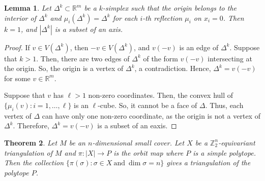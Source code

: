 \documentclass[11pt]{amsart}
\numberwithin{equation}{section}
\newtheorem{theorem}{Theorem}[section]
\newtheorem{lemma}[theorem]{Lemma}
\theoremstyle{definition}
\def \bb{\mathbb}
\def \RR{{\bb{R}}}
\def \ZZ{{\bb{Z}}}
\begin{document}
\begin{lemma}\label{lem_simp_ref}
Let $\Delta^k \subset \mathbb{R}^{m}$ be a $k$-simplex such that the origin belongs to the interior of $\Delta^k$ and $\mu_i(\Delta^k)=\Delta^k$ for each $i$-th reflection $
\mu_i$ on $x_i=0$. Then $k=1$, and $|\Delta^k|$ is a subset of an axis. 
\end{lemma}
\begin{proof}
If $v \in V(\Delta^k)$, then $-v \in V(\Delta^k)$, and $v(-v)$ is an edge of $\Delta^k$. Suppose that $k>1$. Then, there are two edges of $\Delta^k$ of the form $v(-v)$ intersecting at the origin. So, the origin is a vertex of $\Delta^k$, a contradiction. Hence, $\Delta^k=v(-v)$ for some $v\in \RR^m$. 

Suppose that  $v$ has $\ell >1$ non-zero coordinates. Then, the convex hull of $\{\mu_i(v): i=1, \ldots, \ell\}$ is an $\ell$-cube. So, it cannot be a face of $\Delta$. Thus, each vertex of $\Delta$ can have only one non-zero coordinate, as the origin is not a vertex of $\Delta^k$. Therefore,  $\Delta^k=v(-v)$ is a subset of an eaxis.
\end{proof}



\begin{theorem}\label{thm2}
Let $M$ be an $n$-dimensional small cover.
Let $X$ be a $\ZZ_2^n$-equivariant triangulation of $M$ and $\pi \colon |X|\rightarrow P$ is the orbit map where $P$ is a simple polytope. Then the collection
$\{\pi(\sigma) \colon \sigma \in X ~ \mbox{and}~ \dim{\sigma} = n\}$ gives a triangulation of the polytope $P$.
\end{theorem}
\end{document}
